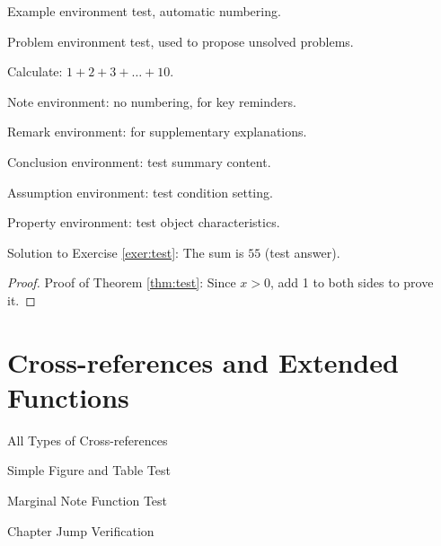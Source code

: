 \begin{definition}
\begin{theorem}
\begin{lemma}
\begin{corollary}
\begin{axiom}
\begin{postulate}
\begin{proposition}
\begin{example}\label{exa:test}
Example environment test, automatic numbering.
\end{example}

\begin{problem}\label{probl:test}
Problem environment test, used to propose unsolved problems.
\end{problem}

\begin{exercise}\label{exer:test}
Calculate: $1+2+3+\dots+10$.
\end{exercise}

\begin{note}
Note environment: no numbering, for key reminders.
\end{note}

\begin{remark}
Remark environment: for supplementary explanations.
\end{remark}

\begin{conclusion}
Conclusion environment: test summary content.
\end{conclusion}

\begin{assumption}
Assumption environment: test condition setting.
\end{assumption}

\begin{property}
Property environment: test object characteristics.
\end{property}

\begin{solution}
Solution to Exercise \ref{exer:test}: The sum is $55$ (test answer).
\end{solution}

\begin{proof}
Proof of Theorem \ref{thm:test}: Since $x>0$, add 1 to both sides to prove it.
\end{proof}

\chapter{Cross-references and Extended Functions}
\begin{introduction}
\item All Types of Cross-references
\item Simple Figure and Table Test
\item Marginal Note Function Test
\item Chapter Jump Verification
\end{introduction}


\end{proposition}
\end{postulate}
\end{axiom}
\end{corollary}
\end{lemma}
\end{theorem}
\end{definition}
